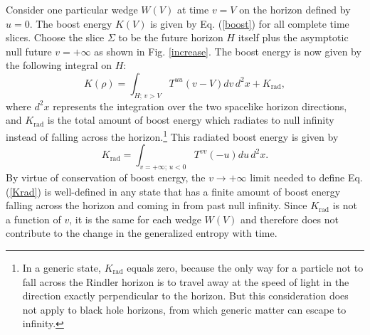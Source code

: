 \documentclass{article}
\begin{document}
Consider one particular wedge $W(V)$ at time $v = V$ on the horizon defined by $u = 0$.  The boost energy $K(V)$ is given by Eq. (\ref{boost}) for all complete time slices.  Choose the slice $\Sigma$ to be the future horizon $H$ itself plus the asymptotic null future $v = +\infty$ as shown in Fig. \ref{increase}.  The boost energy is now given by the following integral on $H$:
\begin{equation}\label{K}
K(\rho) = \int_{H;\,v > V} T^{uu}(v - V) dv\,d^2x + K_\mathrm{rad},
\end{equation}
where $d^2x$ represents the integration over the two spacelike horizon directions, and $K_\mathrm{rad}$ is the total amount of boost energy which radiates to null infinity instead of falling across the horizon.\footnote{In a generic state, $K_\mathrm{rad}$ equals zero, because the only way for a particle not to fall across the Rindler horizon is to travel away at the speed of light in the direction exactly perpendicular to the horizon.  But this consideration does not apply to black hole horizons, from which generic matter can escape to infinity.}  This radiated boost energy is given by
\begin{equation}\label{Krad}
K_\mathrm{rad} = \int_{v = +\infty;\,u < 0} T^{vv} (-u) du\,d^2x.
\end{equation}
By virtue of conservation of boost energy, the $v \to +\infty$ limit needed to define Eq. (\ref{Krad}) is well-defined in any state that has a finite amount of boost energy falling across the horizon and coming in from past null infinity.  Since $K_\mathrm{rad}$ is not a function of $v$, it is the same for each wedge $W(V)$ and therefore does not contribute to the change in the generalized entropy with time.
\end{document}
